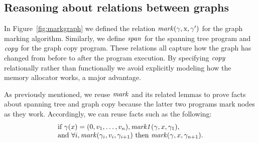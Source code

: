 
\subsection{Reasoning about relations between graphs} %

In Figure~\ref{fig:markgraph} we defined the relation $\mathit{mark}(\gamma, \text{x}, \gamma')$
for the graph marking algorithm.  Similarly, we define $\mathit{span}$ for the spanning tree program
and $\mathit{copy}$ for the graph copy program.
These relations all capture how the graph has changed from before to after the program
execution.  By specifying $\mathit{copy}$ relationally
rather than functionally we avoid explicitly modeling how the memory allocator works, a major advantage.

As previously mentioned, we reuse $\mathit{mark}$ and its
related lemmas to prove facts about spanning tree and graph copy
because the latter two programs mark nodes as they work.
Accordingly, we can reuse facts such as the following:
\[
\begin{array}{@{}l@{}}
\text{if } \gamma(x)=(0, v_1, \dots,v_n), \m{mark1}(\gamma, x, \gamma_1), \\
\text{and } \forall i, \m{mark}(\gamma_i,v_i,\gamma_{i+1}) \text{ then } \m{mark}(\gamma,x,\gamma_{n+1}).
\end{array}
\]


